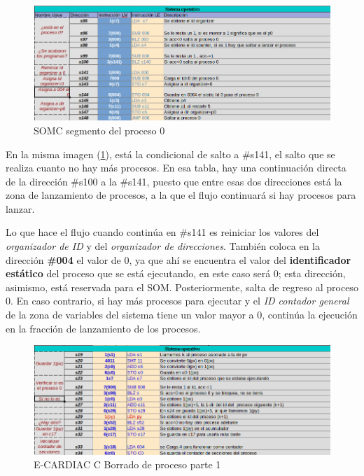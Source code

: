 \documentclass[letterpaper,12pt,oneside]{book}
\begin{document}
        \begin{figure}[H]		
			\centering
			\includegraphics[scale=0.53]{media/CARDIACC/SO_Proceso0.png}
			\caption{ SOMC segmento del proceso 0}
			\label{fig:somcNuceloP0}
		\end{figure}
  
  
        En la misma imagen (\ref{fig:somcNuceloP0}),
		está la condicional de salto a \#s141, el salto que se realiza cuanto no hay más procesos. En esa tabla, hay una continuación directa de la dirección 
		\#s100 a 
		la \#s141, puesto que entre esas dos direcciones está la zona
		de lanzamiento de procesos, a la que el flujo continuará si hay procesos para lanzar. 
		
		Lo que hace el flujo cuando continúa en
		\#s141 es reiniciar los valores del \textit{organizador de ID} y del \textit{organizador de direcciones}. También coloca en la dirección 
		\textbf{\#004} el valor de 0, ya que ahí se encuentra el valor del \textbf{identificador 
		estático} del proceso que se está ejecutando, en este caso será 0; esta dirección, asimismo, está reservada para el SOM. 
		Posteriormente, salta de 
		regreso al proceso 0. En caso contrario, si hay más procesos para ejecutar y
		el \textit{ID contador general} de la zona de variables del sistema tiene un valor mayor a 0, continúa la
		ejecución en la fracción de lanzamiento de los procesos.

		
		\begin{figure}[h]		
			\centering
			\includegraphics[scale=0.53]{media/CARDIACC/SO_Borrar1.png}
			\caption{ E-CARDIAC C Borrado de proceso parte 1}
			\label{fig:somcBorrar1}
		\end{figure}
		
\end{document}
